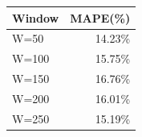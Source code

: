 {\tiny\setlength{\tabcolsep}{2pt}\begin{tabular}{lr} \toprule
Window & MAPE(\%) \\ \midrule
W=50 & 14.23\% \\ 
W=100 & 15.75\% \\ 
W=150 & 16.76\% \\ 
W=200 & 16.01\% \\ 
W=250 & 15.19\% \\ 
\bottomrule \end{tabular}}